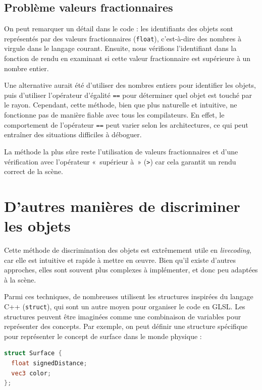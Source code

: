 \subsection*{Problème valeurs fractionnaires}
On peut remarquer un détail dans le code : les identifiants des objets sont représentés par des valeurs fractionnaires (\lstinline{float}), c'est-à-dire des nombres à virgule dans le langage courant. Ensuite, nous vérifions l'identifiant dans la fonction de rendu en examinant si cette valeur fractionnaire est supérieure à un nombre entier.

Une alternative aurait été d'utiliser des nombres entiers pour identifier les objets, puis d'utiliser l'opérateur d'égalité \lstinline{==} pour déterminer quel objet est touché par le rayon. Cependant, cette méthode, bien que plus naturelle et intuitive, ne fonctionne pas de manière fiable avec tous les compilateurs. En effet, le comportement de l'opérateur \lstinline{==} peut varier selon les architectures, ce qui peut entraîner des situations difficiles à déboguer.

La méthode la plus sûre reste l'utilisation de valeurs fractionnaires et d'une vérification avec l'opérateur «~supérieur à~» (\lstinline{>}) car cela garantit un rendu correct de la scène. 

\section{D'autres manières de discriminer les objets}

Cette méthode de discrimination des objets est extrêmement utile en \textit{livecoding}, car elle est intuitive et rapide à mettre en œuvre. Bien qu'il existe d'autres approches, elles sont souvent plus complexes à implémenter, et donc peu adaptées à la scène.

Parmi ces techniques, de nombreuses utilisent les structures inspirées du langage C++ (\lstinline{struct}), qui sont un autre moyen pour organiser le code en GLSL. Les structures peuvent être imaginées comme une combinaison de variables pour représenter des concepts. Par exemple, on peut définir une structure spécifique pour représenter le concept de surface dans le monde physique :

\begin{minipage}{\linewidth}
\begin{lstlisting}[language=GLSL, caption=Utilisation d'une structure,captionpos=b,frame=single] 
struct Surface {
  float signedDistance;
  vec3 color;
};
\end{lstlisting}
\end{minipage}

